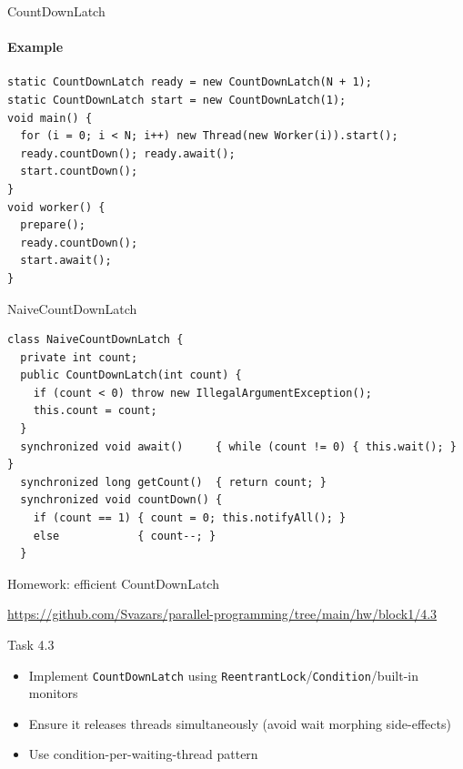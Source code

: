 \begin{frame}[fragile]{CountDownLatch}
\framesubtitle{Example}

\begin{verbatim}
static CountDownLatch ready = new CountDownLatch(N + 1);
static CountDownLatch start = new CountDownLatch(1);
void main() {
  for (i = 0; i < N; i++) new Thread(new Worker(i)).start();
  ready.countDown(); ready.await();
  start.countDown();
}
void worker() {
  prepare();
  ready.countDown();
  start.await();
}
\end{verbatim}
\end{frame}

\begin{frame}[fragile]{NaiveCountDownLatch}

\begin{verbatim}
class NaiveCountDownLatch {
  private int count;
  public CountDownLatch(int count) { 
    if (count < 0) throw new IllegalArgumentException();
    this.count = count; 
  }
  synchronized void await()     { while (count != 0) { this.wait(); } }
  synchronized long getCount()  { return count; }
  synchronized void countDown() {    
    if (count == 1) { count = 0; this.notifyAll(); } 
    else            { count--; }
  }
\end{verbatim}
\end{frame}


\begin{frame}[fragile]{Homework: efficient CountDownLatch}

{\small\url{https://github.com/Svazars/parallel-programming/tree/main/hw/block1/4.3}}
\begin{homeworkmail}{Task 4.3}
    \begin{itemize}
        \item Implement \texttt{CountDownLatch} using \texttt{ReentrantLock}/\texttt{Condition}/built-in monitors
        \item Ensure it releases threads simultaneously (avoid wait morphing side-effects)
        \item Use condition-per-waiting-thread pattern
    \end{itemize}
\end{homeworkmail}
\end{frame}

